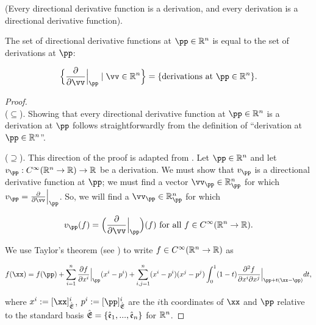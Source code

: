 \begin{theorem}
\label{ch::manifolds::thm::directional_derivs_same_as_derivs}
    (Every directional derivative function is a derivation, and every derivation is a directional derivative function).
    
    The set of directional derivative functions at $\pp \in \R^n$ is equal to the set of derivations at $\pp$:
    
    \begin{align*}
        \Big\{\frac{\pd}{\pd \vv}\Big|_\pp \mid \vv \in \R^n\Big\}
        =
        \{\text{derivations at $\pp \in \R^n$}\}.
    \end{align*}
\end{theorem}

\begin{proof}
   \mbox{}
   \\ \indent ($\subseteq$). Showing that every directional derivative function at $\pp \in \R^n$ is a derivation at $\pp$ follows straightforwardly from the definition of ``derivation at $\pp \in \R^n$''.
    
    ($\supseteq$). This direction of the proof is adapted from \cite[p. 53]{book::SM}. Let $\pp \in \R^n$ and let $v_\pp:C^\infty(\R^n \rightarrow \R) \rightarrow \R$ be a derivation. We must show that $v_\pp$ is a directional derivative function at $\pp$; we must find a vector $\vv_\pp \in \R^n_\pp$ for which $v_\pp = \frac{\pd}{\pd \vv}\Big|_\pp$. So, we will find a $\vv_\pp \in \R^n_\pp$ for which 
    
    \begin{align*}
        v_\pp(f) = \Big(\frac{\pd}{\pd \vv}\Big|_\pp\Big)(f) \text{ for all $f \in C^\infty(\R^n \rightarrow \R)$.}
    \end{align*}
    
    We use Taylor's theorem (see \cite[p. 53]{book::SM}) to write $f \in C^\infty(\mathbb{R}^n \rightarrow \mathbb{R})$ as
    
    \begin{align*}
        f(\xx) = f(\pp) 
        + \sum_{i = 1}^n \frac{\pd f}{\pd x^i}\Big|_\pp (x^i - p^i)
        + \sum_{i, j = 1}^n (x^i - p^i) (x^j - p^j) \int_0^1 (1 - t) \frac{\pd^2 f}{\pd x^i \pd x^j}\Big|_{\pp + t(\xx - \pp)} dt,
    \end{align*}
    
    where $x^i := [\xx]_\sE^i$, $p^i := [\pp]_\sE^i$ are the $i$th coordinates of $\xx$ and $\pp$ relative to the standard basis ${\hat{\mathfrak{E}}} = \{\hat{\mathfrak{e}}_1, ..., \hat{\mathfrak{e}}_n\}$ for $\mathbb{R}^n$.
    

\end{proof}
